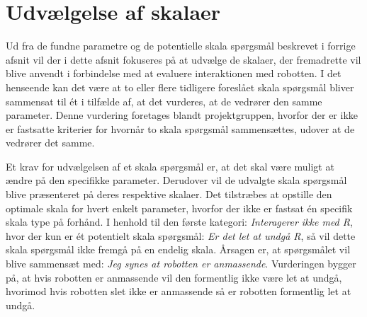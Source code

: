 \section{Udvælgelse af skalaer}
\label{ParametreDatabehandlingSkalaer}
%
Ud fra de fundne parametre og de potentielle skala spørgsmål beskrevet i forrige afsnit vil der i dette afsnit fokuseres på at udvælge de skalaer, der fremadrette vil blive anvendt i forbindelse med at evaluere interaktionen med robotten. I det henseende kan det være at to eller flere tidligere foreslået skala spørgsmål bliver sammensat til ét i tilfælde af, at det vurderes, at de vedrører den samme parameter. Denne vurdering foretages blandt projektgruppen, hvorfor der er ikke er fastsatte kriterier for hvornår to skala spørgsmål sammensættes, udover at de vedrører det samme.

Et krav for udvælgelsen af et skala spørgsmål er, at det skal være muligt at ændre på den specifikke parameter. Derudover vil de udvalgte skala spørgsmål blive præsenteret på deres respektive skalaer. Det tilstræbes at opstille den optimale skala for hvert enkelt parameter, hvorfor der ikke er fastsat én specifik skala type på forhånd.\blankline
%
I henhold til den første kategori: \textit{Interagerer ikke med R}, hvor der kun er ét potentielt skala spørgsmål: \textit{Er det let at undgå R}, så vil dette skala spørgsmål ikke fremgå på en endelig skala. Årsagen er, at spørgsmålet vil blive sammensæt med: \textit{Jeg synes at robotten er anmassende}. Vurderingen bygger på, at hvis robotten er anmassende vil den formentlig ikke være let at undgå, hvorimod hvis robotten slet ikke er anmassende så er robotten formentlig let at undgå. 

